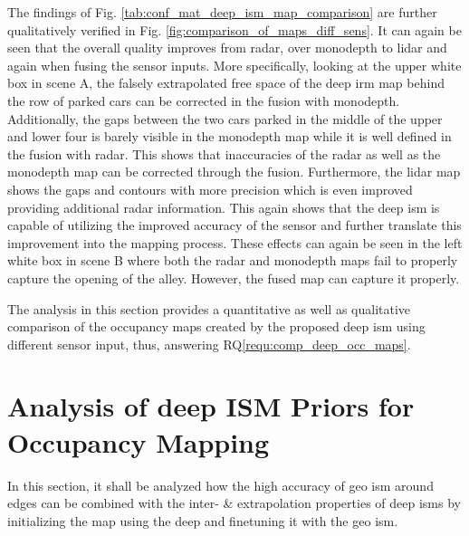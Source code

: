 The findings of Fig. \ref{tab:conf_mat_deep_ism_map_comparison} are further qualitatively verified in Fig. \ref{fig:comparison_of_maps_diff_sens}. It can again be seen that the overall quality improves from radar, over \gls{monodepth} to lidar and again when fusing the sensor inputs. More specifically, looking at the upper white box in scene A, the falsely extrapolated free space of the deep \gls{irm} map behind the row of parked cars can be corrected in the fusion with \gls{monodepth}. Additionally, the gaps between the two cars parked in the middle of the upper and lower four is barely visible in the \gls{monodepth} map while it is well defined in the fusion with radar. This shows that inaccuracies of the radar as well as the \gls{monodepth} map can be corrected through the fusion. Furthermore, the lidar map shows the gaps and contours with more precision which is even improved providing additional radar information. This again shows that the deep \gls{ism} is capable of utilizing the improved accuracy of the sensor and further translate this improvement into the mapping process. These effects can again be seen in the left white box in scene B where both the radar and \gls{monodepth} maps fail to properly capture the opening of the alley. However, the fused map can capture it properly.
\begin{center}
\end{center}
The analysis in this section provides a quantitative as well as qualitative comparison of the occupancy maps created by the proposed deep \gls{ism} using different sensor input, thus, answering RQ\ref{requ:comp_deep_occ_maps}.
%
\section{Analysis of deep ISM Priors for Occupancy Mapping}
\label{sec:exp_analyze_prior_properties}
In this section, it shall be analyzed how the high accuracy of geo \gls{ism} around edges can be combined with the inter- \& extrapolation properties of deep \gls{ism}s by initializing the map using the deep and finetuning it with the geo \gls{ism}.
%
